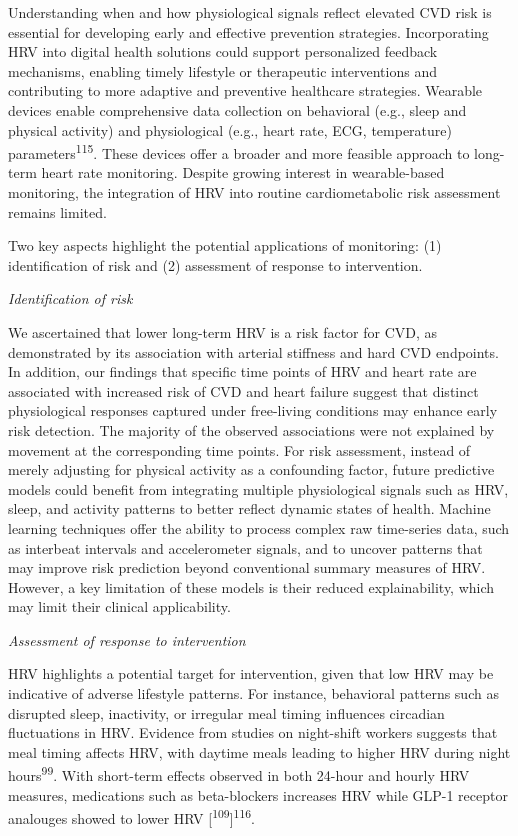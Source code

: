 \documentclass[
  a4paper,
  headsepline=true,
  open=any]{scrbook}
\begin{document}
Understanding when and how physiological signals reflect elevated CVD
risk is essential for developing early and effective prevention
strategies. Incorporating HRV into digital health solutions could
support personalized feedback mechanisms, enabling timely lifestyle or
therapeutic interventions and contributing to more adaptive and
preventive healthcare strategies. Wearable devices enable comprehensive
data collection on behavioral (e.g., sleep and physical activity) and
physiological (e.g., heart rate, ECG, temperature)
parameters\textsuperscript{115}. These devices offer a broader and more
feasible approach to long-term heart rate monitoring. Despite growing
interest in wearable-based monitoring, the integration of HRV into
routine cardiometabolic risk assessment remains limited.

Two key aspects highlight the potential applications of monitoring: (1)
identification of risk and (2) assessment of response to intervention.

\emph{Identification of risk}

We ascertained that lower long-term HRV is a risk factor for CVD, as
demonstrated by its association with arterial stiffness and hard CVD
endpoints. In addition, our findings that specific time points of HRV
and heart rate are associated with increased risk of CVD and heart
failure suggest that distinct physiological responses captured under
free-living conditions may enhance early risk detection. The majority of
the observed associations were not explained by movement at the
corresponding time points. For risk assessment, instead of merely
adjusting for physical activity as a confounding factor, future
predictive models could benefit from integrating multiple physiological
signals such as HRV, sleep, and activity patterns to better reflect
dynamic states of health. Machine learning techniques offer the ability
to process complex raw time-series data, such as interbeat intervals and
accelerometer signals, and to uncover patterns that may improve risk
prediction beyond conventional summary measures of HRV. However, a key
limitation of these models is their reduced explainability, which may
limit their clinical applicability.

\emph{Assessment of response to intervention}

HRV highlights a potential target for intervention, given that low HRV
may be indicative of adverse lifestyle patterns. For instance,
behavioral patterns such as disrupted sleep, inactivity, or irregular
meal timing influences circadian fluctuations in HRV. Evidence from
studies on night-shift workers suggests that meal timing affects HRV,
with daytime meals leading to higher HRV during night
hours\textsuperscript{99}. With short-term effects observed in both
24-hour and hourly HRV measures, medications such as beta-blockers
increases HRV while GLP-1 receptor analouges showed to lower HRV
{[}\textsuperscript{109}{]}\textsuperscript{116}.
\end{document}
